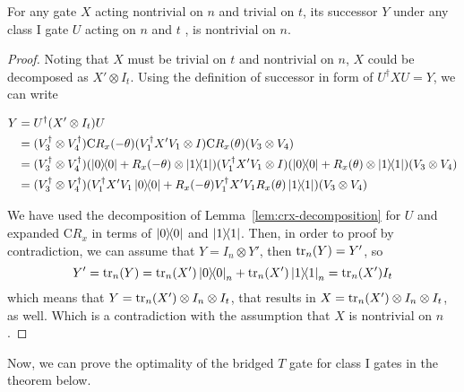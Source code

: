 \begin{lemma}\label{lem:no-move-class-i}
  For any gate $X$ acting nontrivial on $n$ and trivial on $t$, its successor $Y$ under any class I gate $U$ acting on $n$ and $t$ , is nontrivial on $n$.
\end{lemma}
\begin{proof}
  Noting that $X$ must be trivial on $t$ and nontrivial on $n$, $X$ could be decomposed as $X' \otimes I_t$.
  Using the definition of successor in form of $U^\dagger X U = Y$, we can write

  \begin{equation}
    \begin{aligned}
    Y &= U^\dagger (X' \otimes I_t) U  \\
    &= (V_3^\dagger \otimes V_4^\dagger)\mathrm{C}R_x(-\theta) (V_1^\dagger X' V_1 \otimes I) \mathrm{C}R_x(\theta) (V_3 \otimes V_4) \\
    &= (V_3^\dagger \otimes V_4^\dagger)(\dyad{0} + R_x(-\theta) \otimes \dyad{1}) (V_1^\dagger X' V_1 \otimes I) (\dyad{0} + R_x(\theta) \otimes \dyad{1}) (V_3 \otimes V_4) \\
    &= (V_3^\dagger \otimes V_4^\dagger)(V_1^\dagger X' V_1 \dyad{0} + R_x(-\theta) V_1^\dagger X' V_1 R_x(\theta) \dyad{1}) (V_3 \otimes V_4)
    \end{aligned}
  \end{equation}

  We have used the decomposition of Lemma~\ref{lem:crx-decomposition} for $U$ and expanded $\mathrm{C}R_x$ in terms of $\dyad{0}$ and $\dyad{1}$. Then, in order to proof by contradiction, we can assume that $Y = I_n \otimes Y'$, then $\tr_n(Y) = Y'$, so
  \begin{equation}
    Y' = \tr_n(Y) = \tr_n(X') \dyad{0}_n + \tr_n(X') \dyad{1}_n = \tr_n(X') I_t
  \end{equation}
  which means that $Y = \tr_n(X') \otimes I_n \otimes I_t$, that results in $X = \tr_n(X') \otimes I_n \otimes I_t$,  as well. Which is a contradiction with the assumption that $X$ is nontrivial on $n$.
\end{proof}

Now, we can prove the optimality of the bridged $T$ gate for class I gates in the theorem below.

